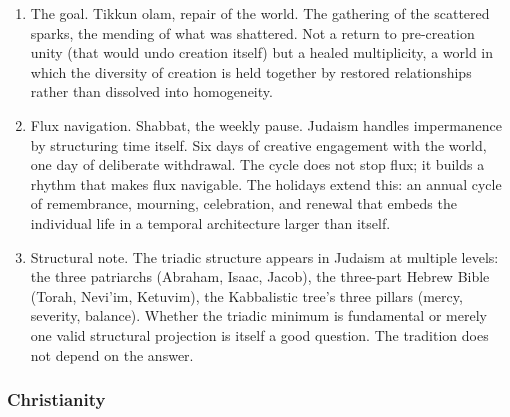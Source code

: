 \documentclass[
]{article}
\providecommand{\tightlist}{%
  \setlength{\itemsep}{0pt}\setlength{\parskip}{0pt}}
\begin{document}
\begin{enumerate}
\def\labelenumi{\arabic{enumi}.}
\setcounter{enumi}{19}
\tightlist
\item
  The goal. Tikkun olam, repair of the world. The gathering of the
  scattered sparks, the mending of what was shattered. Not a return to
  pre-creation unity (that would undo creation itself) but a healed
  multiplicity, a world in which the diversity of creation is held
  together by restored relationships rather than dissolved into
  homogeneity.
\item
  Flux navigation. Shabbat, the weekly pause. Judaism handles
  impermanence by structuring time itself. Six days of creative
  engagement with the world, one day of deliberate withdrawal. The cycle
  does not stop flux; it builds a rhythm that makes flux navigable. The
  holidays extend this: an annual cycle of remembrance, mourning,
  celebration, and renewal that embeds the individual life in a temporal
  architecture larger than itself.
\item
  Structural note. The triadic structure appears in Judaism at multiple
  levels: the three patriarchs (Abraham, Isaac, Jacob), the three-part
  Hebrew Bible (Torah, Nevi'im, Ketuvim), the Kabbalistic tree's three
  pillars (mercy, severity, balance). Whether the triadic minimum is
  fundamental or merely one valid structural projection is itself a good
  question. The tradition does not depend on the answer.
\end{enumerate}

\subsubsection{Christianity}\label{christianity}
\end{document}
